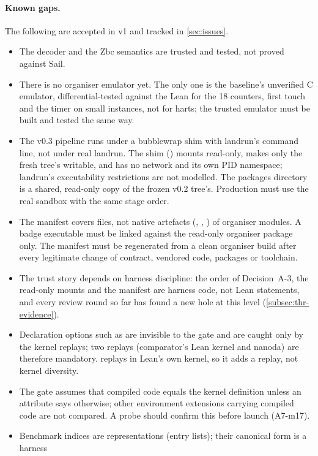 \paragraph{Known gaps.} The following are accepted in v1 and tracked in \cref{sec:issues}.
\begin{itemize}[nosep]
\item The decoder and the Zbc semantics are trusted and tested, not proved against Sail.
\item There is no organiser emulator yet. The only one is the baseline's unverified C emulator,
  differential-tested against the Lean  for the 18 counters, first touch and the timer
  on small instances, not for harts; the trusted emulator must be built and tested the same way.
\item The v0.3 pipeline runs under a bubblewrap shim with landrun's command line, not under real
  landrun. The shim () mounts \code{/} read-only, makes only the fresh tree's
   writable, and has no network and its own PID namespace; landrun's executability restrictions are not
  modelled. The packages directory is a shared, read-only copy of the frozen v0.2 tree's. Production
  must use the real sandbox with the same stage order.
\item The manifest covers  files, not native artefacts (, ,
  ) of organiser modules. A badge executable must be linked against the read-only organiser
  package only. The manifest must be regenerated from a clean organiser build after every legitimate
  change of contract, vendored code, packages or toolchain.
\item The trust story depends on harness discipline: the order of Decision~A-3, the read-only
  mounts and the manifest are harness code, not Lean statements, and every review round so far has
  found a new hole at this level (\cref{subsec:thr-evidence}).
\item Declaration options such as  are invisible to the gate and are caught
  only by the kernel replays; two replays (comparator's Lean kernel and nanoda) are therefore
  mandatory.  replays in Lean's own kernel, so it adds a replay, not kernel
  diversity.
\item The gate assumes that compiled code equals the kernel definition unless an attribute says
  otherwise; other environment extensions carrying compiled code are not compared. A probe should
  confirm this before launch (A7-m17).
\item Benchmark indices are representations (entry lists); their canonical form is a harness

\end{itemize}
